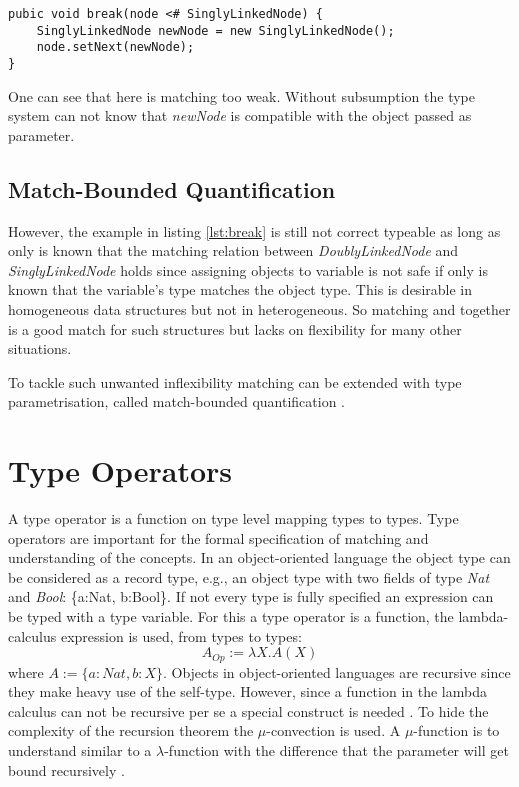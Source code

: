 \begin{lstlisting}[float,label={lst:matchbreak},caption={Matching relation in the break method}]
pubic void break(node <# SinglyLinkedNode) {
	SinglyLinkedNode newNode = new SinglyLinkedNode();
	node.setNext(newNode);
}
\end{lstlisting}

One can see that here is matching too weak. Without subsumption the type system
can not know that \emph{newNode} is compatible with the object passed as parameter.

\subsection{Match-Bounded Quantification}
However, the example in listing \ref{lst:break} is still not correct
typeable as long as only is known that the matching relation between
\emph{DoublyLinkedNode} and \emph{SinglyLinkedNode} holds since assigning
objects to variable is not safe if only is known that the variable's type
matches the object type. This is desirable in homogeneous data structures
but not in heterogeneous. So matching and \mytype together is a good match
for such structures but lacks on flexibility for many other situations.

To tackle such unwanted inflexibility matching can be extended
with type parametrisation, called match-bounded quantification
\cite{abadi_subtyping_1996}. 

\section{Type Operators}
A type operator is a function on type level mapping types to types. Type
operators are important for the formal specification of matching and
understanding of the concepts. In an object-oriented language the object
type can be considered as a record type, e.g., an object type with two
fields of type \emph{Nat} and \emph{Bool}: \{a:Nat, b:Bool\}. If not
every type is fully specified an expression can be typed with a type
variable. For this a type operator is a function, the lambda-calculus
expression is used, from types to types: \[A_{Op} := \lambda X.A(X)
\] where $A := \{a:Nat, b:X\}$. Objects in object-oriented languages are
recursive since they make heavy use of the self-type. However, since a
function in the lambda calculus can not be recursive per se a special
construct is needed \cite{gabriel_why_1988}.  To hide the complexity of
the recursion theorem the $\mu$-convection is used. A $\mu$-function is
to understand similar to a $\lambda$-function with the difference that
the parameter will get bound recursively \cite{simons_theory_2002-3}.

